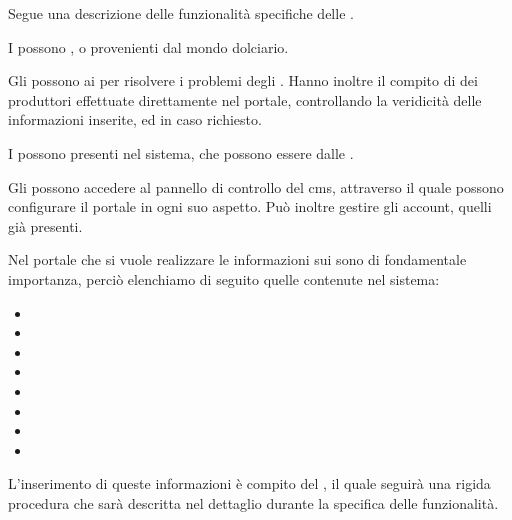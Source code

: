 \bigskip
\noindent
Segue una descrizione delle funzionalità specifiche delle .

I  possono ,  o   provenienti dal mondo dolciario.

Gli  possono  ai  per risolvere i problemi degli . Hanno inoltre il compito di  dei produttori effettuate direttamente nel portale, controllando la veridicità delle informazioni inserite, ed in caso  richiesto.

I  possono  presenti nel sistema, che possono essere  dalle .

Gli  possono accedere al pannello di controllo del \gls{cms}, attraverso il quale possono configurare il portale in ogni suo aspetto. Può inoltre gestire gli account,  quelli già presenti. 

\bigskip
\noindent
Nel portale che si vuole realizzare le informazioni sui  sono di fondamentale importanza, perciò elenchiamo di seguito quelle contenute nel sistema:
\begin{itemize}
	\item {}
	\item {}
	\item {}
	\item {}
	\item {}
	\item {}
	\item {}
	\item {}
\end{itemize}
L'inserimento di queste informazioni è compito del , il quale seguirà una rigida procedura che sarà descritta nel dettaglio durante la specifica delle funzionalità.


